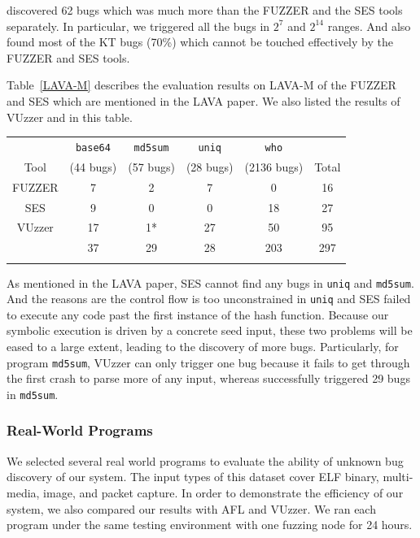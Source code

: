 \prototype discovered 62 bugs which was much more than the FUZZER and the 
SES tools separately. In particular, we triggered all the bugs in $2^7$ and 
$2^{14}$ ranges. And also found most of the KT bugs (70\%) which cannot be 
touched effectively by the FUZZER and SES tools. 

Table~\ref{LAVA-M} describes the evaluation results on LAVA-M of the FUZZER 
and SES which are mentioned in the LAVA paper. We also listed the results 
of VUzzer and \prototype in this table. 
\begin{table}[!b]
{\begin{tabular*}{20pc}{@{\extracolsep{\fill}}cccccc@{}}\toprule
	     & \texttt{base64} & \texttt{md5sum} & \texttt{uniq} & \texttt{who} &   \\
	     Tool    & (44 bugs) & (57 bugs) & (28 bugs) & (2136 bugs) &  Total\\
\midrule
		FUZZER 		& 7  & 2  & 7    & 0   & 16  \\
		SES	        & 9  & 0  & 0    & 18  & 27  \\
		VUzzer		& 17 & 1* & 27   & 50  & 95 \\
		\prototype	& 37 & 29 & 28   & 203 & 297 \\
\botrule
\end{tabular*}}{}
\end{table}


As mentioned in the LAVA paper, SES cannot find any bugs in \texttt{uniq} and 
\texttt{md5sum}. And the reasons are the control flow is too unconstrained in 
\texttt{uniq} and SES failed to execute any code past the first instance of 
the hash function. Because our symbolic execution is driven by a concrete seed 
input, these two problems will be eased to a large extent, leading to the 
discovery of more bugs. Particularly, for program \texttt{md5sum}, VUzzer can 
only trigger one bug because it fails to get through the first crash to parse 
more of any input, whereas \prototype successfully triggered 29 bugs in 
\texttt{md5sum}.

\subsubsection{Real-World Programs}
We selected several real world programs to evaluate the ability of unknown bug 
discovery of our system. The input types of this dataset cover ELF binary, 
multi-media, image, and packet capture. In order to demonstrate the efficiency 
of our system, we also compared our results with AFL and VUzzer. We ran each
 program under the same testing environment with one fuzzing node for 24 hours. 

